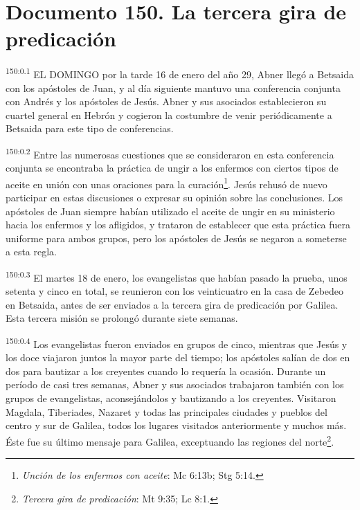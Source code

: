 \chapter{Documento 150. La tercera gira de predicación}
\par 
\textsuperscript{150:0.1} EL DOMINGO por la tarde 16 de enero del año 29, Abner llegó a Betsaida con los apóstoles de Juan, y al día siguiente mantuvo una conferencia conjunta con Andrés y los apóstoles de Jesús. Abner y sus asociados establecieron su cuartel general en Hebrón y cogieron la costumbre de venir periódicamente a Betsaida para este tipo de conferencias.

\par 
\textsuperscript{150:0.2} Entre las numerosas cuestiones que se consideraron en esta conferencia conjunta se encontraba la práctica de ungir a los enfermos con ciertos tipos de aceite en unión con unas oraciones para la curación\footnote{\textit{Unción de los enfermos con aceite}: Mc 6:13b; Stg 5:14.}. Jesús rehusó de nuevo participar en estas discusiones o expresar su opinión sobre las conclusiones. Los apóstoles de Juan siempre habían utilizado el aceite de ungir en su ministerio hacia los enfermos y los afligidos, y trataron de establecer que esta práctica fuera uniforme para ambos grupos, pero los apóstoles de Jesús se negaron a someterse a esta regla.

\par 
\textsuperscript{150:0.3} El martes 18 de enero, los evangelistas que habían pasado la prueba, unos setenta y cinco en total, se reunieron con los veinticuatro en la casa de Zebedeo en Betsaida, antes de ser enviados a la tercera gira de predicación por Galilea. Esta tercera misión se prolongó durante siete semanas.

\par 
\textsuperscript{150:0.4} Los evangelistas fueron enviados en grupos de cinco, mientras que Jesús y los doce viajaron juntos la mayor parte del tiempo; los apóstoles salían de dos en dos para bautizar a los creyentes cuando lo requería la ocasión. Durante un período de casi tres semanas, Abner y sus asociados trabajaron también con los grupos de evangelistas, aconsejándolos y bautizando a los creyentes. Visitaron Magdala, Tiberiades, Nazaret y todas las principales ciudades y pueblos del centro y sur de Galilea, todos los lugares visitados anteriormente y muchos más. Éste fue su último mensaje para Galilea, exceptuando las regiones del norte\footnote{\textit{Tercera gira de predicación}: Mt 9:35; Lc 8:1.}.

